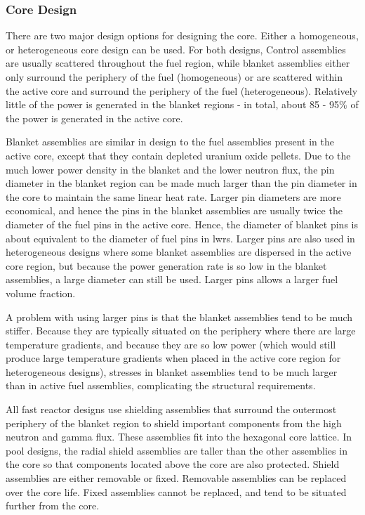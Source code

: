 \documentclass[10pt]{article}
\numberwithin{equation}{section} %
\begin{document}
\subsubsection{Core Design}
There are two major design options for designing the core. Either a homogeneous, or heterogeneous core design can be used. For both designs, Control assemblies are usually scattered throughout the fuel region, while blanket assemblies either only surround the periphery of the fuel (homogeneous) or are scattered within the active core and surround the periphery of the fuel (heterogeneous). Relatively little of the power is generated in the blanket regions - in total, about 85 - 95\% of the power is generated in the active core. 

Blanket assemblies are similar in design to the fuel assemblies present in the active core, except that they contain depleted uranium oxide pellets. Due to the much lower power density in the blanket and the lower neutron flux, the pin diameter in the blanket region can be made much larger than the pin diameter in the core to maintain the same linear heat rate. Larger pin diameters are more economical, and hence the pins in the blanket assemblies are usually twice the diameter of the fuel pins in the active core. Hence, the diameter of blanket pins is about equivalent to the diameter of fuel pins in \gls{lwr}s. Larger pins are also used in heterogeneous designs where some blanket assemblies are dispersed in the active core region, but because the power generation rate is so low in the blanket assemblies, a large diameter can still be used. Larger pins allows a larger fuel volume fraction. 

A problem with using larger pins is that the blanket assemblies tend to be much stiffer. Because they are typically situated on the periphery where there are large temperature gradients, and because they are so low power (which would still produce large temperature gradients when placed in the active core region for heterogeneous designs), stresses in blanket assemblies tend to be much larger than in active fuel assemblies, complicating the structural requirements. 

All fast reactor designs use shielding assemblies that surround the outermost periphery of the blanket region to shield important components from the high neutron and gamma flux. These assemblies fit into the hexagonal core lattice. In pool designs, the radial shield assemblies are taller than the other assemblies in the core so that components located above the core are also protected. Shield assemblies are either removable or fixed. Removable assemblies can be replaced over the core life. Fixed assemblies cannot be replaced, and tend to be situated further from the core. 
\end{document}
